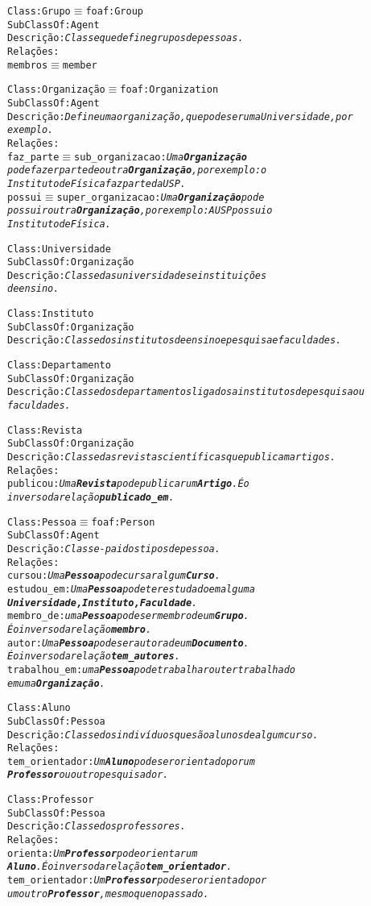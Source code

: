 \begin{alltt}
Class: Grupo \( \equiv \) foaf:Group
SubClassOf: Agent
Descrição: \emph{Classe que define grupos de pessoas.}
Relações:
  membros \( \equiv \) member

Class: Organização \( \equiv \) foaf:Organization
SubClassOf: Agent
Descrição: \emph{Define uma organização, que pode ser uma Universidade, por
exemplo.}
Relações:
  faz_parte \( \equiv \) sub_organizacao: \emph{Uma \textbf{Organização}
pode fazer parte de outra \textbf{Organização}, por exemplo: o
Instituto de Física faz parte da USP.}
  possui \( \equiv \) super_organizacao: \emph{Uma \textbf{Organização} pode
possuir outra \textbf{Organização}, por exemplo: A USP possui o
Instituto de Física.}

Class: Universidade
SubClassOf: Organização
Descrição: \emph{Classe das universidades e instituições
de ensino.}

Class:Instituto
SubClassOf: Organização
Descrição: \emph{Classe dos institutos de ensino e pesquisa e faculdades.}

Class: Departamento
SubClassOf: Organização
Descrição: \emph{Classe dos departamentos ligados a institutos de pesquisa ou
faculdades.}

Class: Revista
SubClassOf: Organização
Descrição: \emph{Classe das revistas científicas que publicam artigos.}
Relações:
  publicou: \emph{Uma \textbf{Revista} pode publicar um \textbf{Artigo}. É o
  inverso da relação \textbf{publicado_em}.}

Class: Pessoa \( \equiv \) foaf:Person
SubClassOf: Agent
Descrição: \emph{Classe-pai dos tipos de pessoa.}
Relações:
  cursou: \emph{Uma \textbf{Pessoa} pode cursar algum \textbf{Curso}.}
  estudou_em: \emph{Uma \textbf{Pessoa} pode ter estudado em alguma
\textbf{Universidade, Instituto, Faculdade}.}
  membro_de: \emph{uma \textbf{Pessoa} pode ser membro de um  \textbf{Grupo}.
  É o inverso da relação \textbf{membro}.}
  autor: \emph{Uma \textbf{Pessoa} pode ser autora de um  \textbf{Documento}.
  É o inverso da relação \textbf{tem_autores}.}
  trabalhou_em: \emph{uma \textbf{Pessoa} pode trabalhar ou ter trabalhado
  em uma \textbf{Organização}.}

Class: Aluno
SubClassOf: Pessoa
Descrição: \emph{Classe dos indivíduos que são alunos de algum curso.}
Relações:
  tem_orientador: \emph{Um \textbf{Aluno} pode ser orientado por um
  \textbf{Professor} ou outro pesquisador.}

Class: Professor
SubClassOf: Pessoa
Descrição: \emph{Classe dos professores.}
Relações:
  orienta: \emph{Um \textbf{Professor} pode orientar um
  \textbf{Aluno}. É o inverso da relação \textbf{tem_orientador}.}
  tem_orientador: \emph{Um \textbf{Professor} pode ser orientado por
  um outro \textbf{Professor}, mesmo que no passado.}


\end{alltt}
